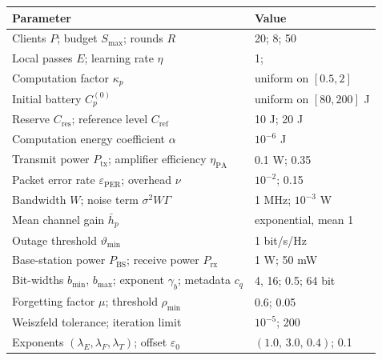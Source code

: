 \begin{table}[t]
	\centering
	\label{tab:setup}
	\footnotesize
	\setlength{\tabcolsep}{3pt}
	\begin{tabularx}{\columnwidth}{>{\raggedright\arraybackslash}X l}
		\toprule
		\textbf{Parameter} & \textbf{Value} \\
		\midrule
		Clients $P$; budget $S_{\max}$; rounds $R$ & 20; 8; 50 \\
		Local passes $E$; learning rate $\eta$ & 1; \V{lr} \\
		Computation factor $\kappa_p$ & uniform on $[0.5,2]$ \\
		Initial battery $C_p^{(0)}$ & uniform on $[80,200]$ J \\
		Reserve $C_{\mathrm{res}}$; reference level $C_{\mathrm{ref}}$ & 10 J; 20 J \\
		Computation energy coefficient $\alpha$ & $10^{-6}$ J \\
		Transmit power $P_{\mathrm{tx}}$; amplifier efficiency $\eta_{\mathrm{PA}}$ & 0.1 W; 0.35 \\
		Packet error rate $\varepsilon_{\mathrm{PER}}$; overhead $\nu$ & $10^{-2}$; 0.15 \\
		Bandwidth $W$; noise term $\sigma^2W\Gamma$ & 1 MHz; $10^{-3}$ W \\
		Mean channel gain $\bar h_p$ & exponential, mean 1 \\
		Outage threshold $\vartheta_{\min}$ & 1 bit/s/Hz \\
		Base-station power $P_{\mathrm{BS}}$; receive power $P_{\mathrm{rx}}$ & 1 W; 50 mW \\
		Bit-widths $b_{\min}$, $b_{\max}$; exponent $\gamma_b$; metadata $c_q$ & 4, 16; 0.5; 64 bit \\
		Forgetting factor $\mu$; threshold $\rho_{\min}$ & 0.6; 0.05 \\
		Weiszfeld tolerance; iteration limit & $10^{-5}$; 200 \\
		Exponents $(\lambda_E,\lambda_F,\lambda_T)$; offset $\varepsilon_0$ & $(1.0,\,3.0,\,0.4)$; 0.1 \\
		\bottomrule
	\end{tabularx}
\end{table}

